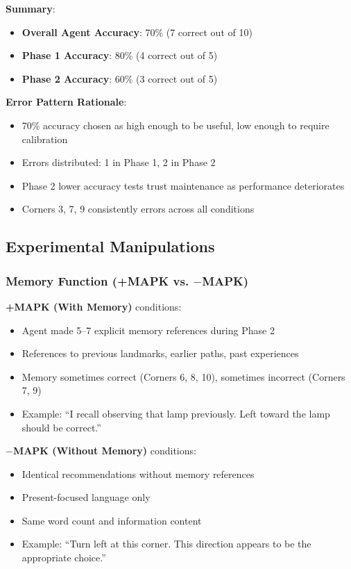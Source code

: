 \documentclass[12pt]{article}
\begin{document}
\textbf{Summary}:
\begin{itemize}
    \item \textbf{Overall Agent Accuracy}: 70\% (7 correct out of 10)
    \item \textbf{Phase 1 Accuracy}: 80\% (4 correct out of 5)
    \item \textbf{Phase 2 Accuracy}: 60\% (3 correct out of 5)
\end{itemize}

\textbf{Error Pattern Rationale}:
\begin{itemize}
    \item 70\% accuracy chosen as high enough to be useful, low enough to require calibration
    \item Errors distributed: 1 in Phase 1, 2 in Phase 2
    \item Phase 2 lower accuracy tests trust maintenance as performance deteriorates
    \item Corners 3, 7, 9 consistently errors across all conditions
\end{itemize}

\subsection{Experimental Manipulations}

\subsubsection{Memory Function (+MAPK vs. $-$MAPK)}

\textbf{+MAPK (With Memory)} conditions:
\begin{itemize}
    \item Agent made 5--7 explicit memory references during Phase 2
    \item References to previous landmarks, earlier paths, past experiences
    \item Memory sometimes correct (Corners 6, 8, 10), sometimes incorrect (Corners 7, 9)
    \item Example: ``I recall observing that lamp previously. Left toward the lamp should be correct.''
\end{itemize}

\textbf{$-$MAPK (Without Memory)} conditions:
\begin{itemize}
    \item Identical recommendations without memory references
    \item Present-focused language only
    \item Same word count and information content
    \item Example: ``Turn left at this corner. This direction appears to be the appropriate choice.''
\end{itemize}
\end{document}
